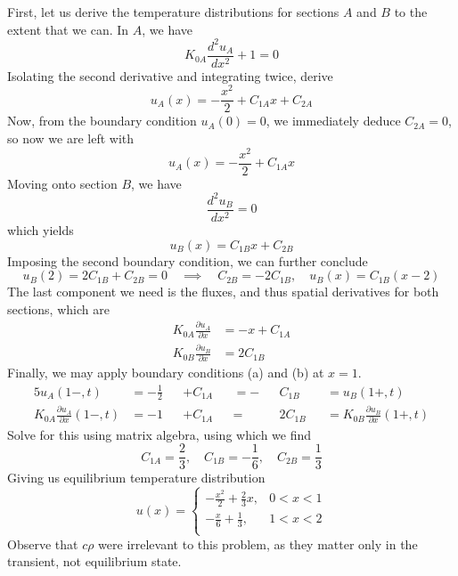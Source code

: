 \documentclass[a4paper]{article}
\begin{document}
First, let us derive the temperature distributions for sections \( A \) and \( B \) to the extent that we can. In \( A \), we have
\[
	K_{0A}\frac{d^{2}u_{A}}{dx^{2}} + 1 = 0 
\]
Isolating the second derivative and integrating twice, derive
\[
	u_{A}\!\left( x \right) = -\frac{x^{2}}{2} + C_{1A}x + C_{2A}  
\]
Now, from the boundary condition \( u_{A}\!\left( 0 \right) = 0 \), we immediately deduce \( C_{2A} = 0 \), so now we are left with
\[
	u_{A}\!\left( x \right) = -\frac{x^{2}}{2} + C_{1A}x  
\]
Moving onto section \( B \), we have
\[
	\frac{d^{2}u_{B}}{dx^{2}} = 0
\]
which yields
\[
	u_{B}\!\left( x \right) = C_{1B}x + C_{2B}
\]
Imposing the second boundary condition, we can further conclude
\[
	u_{B}\!\left( 2 \right) = 2C_{1B} + C_{2B} = 0 \quad \implies \quad C_{2B} = -2C_{1B}, \quad u_{B}\!\left( x \right) = C_{1B}\!\left( x - 2 \right)
\]
The last component we need is the fluxes, and thus spatial derivatives for both sections, which are
\begin{align*}
	K_{0A}\frac{\partial u_{A}}{\partial x} & = -x + C_{1A} \\
	K_{0B}\frac{\partial u_{B}}{\partial x} & = 2C_{1B}
\end{align*}
Finally, we may apply boundary conditions (a) and (b) at \( x = 1 \).
\begin{alignat*}{5}
	u_{A}\!\left( 1-,t \right) & = -\frac{1}{2} && + C_{1A} && = - && C_{1B} && = u_{B}\!\left( 1+,t \right) \\
	K_{0A}\frac{\partial u_{A}}{\partial x}\!\left( 1-,t \right) & = -1 && + C_{1A} && = && 2C_{1B} && = K_{0B}\frac{\partial u_{B}}{\partial x}\!\left( 1+,t \right)
\end{alignat*}
Solve for this using matrix algebra, using which we find
\[
	C_{1A} = \frac{2}{3}, \quad C_{1B} = -\frac{1}{6}, \quad C_{2B} = \frac{1}{3} 
\]
Giving us equilibrium temperature distribution
\[
	u \!\left( x \right) = \begin{cases}
		\displaystyle{-\frac{x^{2}}{2} + \frac{2}{3}x}, & 0 < x < 1 \\[12pt]
		\displaystyle{-\frac{x}{6} + \frac{1}{3}}, & 1 < x < 2 \\
	\end{cases} 
\]
Observe that \( c \rho \) were irrelevant to this problem, as they matter only in the transient, not equilibrium state.

\vspace{12pt}

\end{document}
